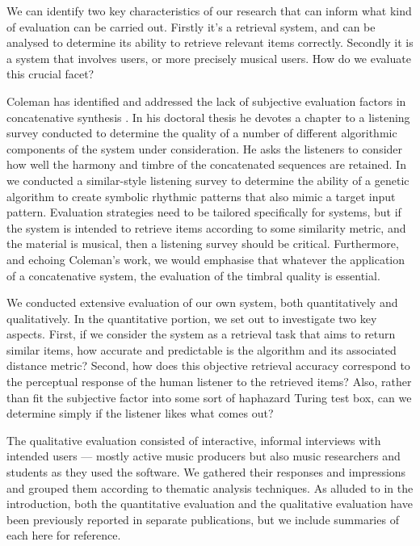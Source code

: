 We can identify two key characteristics of our research that can inform what kind of evaluation can be carried out. Firstly it’s a retrieval system, and can be analysed to determine its ability to retrieve relevant items correctly. Secondly it is a system that involves users, or more precisely musical users. How do we evaluate this crucial facet?

Coleman has identified and addressed the lack of subjective evaluation factors in concatenative synthesis \citep{Coleman2015}. In his doctoral thesis he devotes a chapter to a listening survey conducted to determine the quality of a number of different algorithmic components of the system under consideration. He asks the listeners to consider how well the harmony and timbre of the concatenated sequences are retained. In  we conducted a similar-style listening survey to determine the ability of a genetic algorithm to create symbolic rhythmic patterns that also mimic a target input pattern. Evaluation strategies need to be tailored specifically for systems, but if the system is intended to retrieve items according to some similarity metric, and the material is musical, then a listening survey should be critical. Furthermore, and echoing Coleman's work, we would emphasise that whatever the application of a concatenative system, the evaluation of the timbral quality is essential.

We conducted extensive evaluation of our own system, both quantitatively and qualitatively. In the quantitative portion, we set out to investigate two key aspects. First, if we consider the system as a retrieval task that aims to return similar items, how accurate and predictable is the algorithm and its associated distance metric? Second, how does this objective retrieval accuracy correspond to the perceptual response of the human listener to the retrieved items? Also, rather than fit the subjective factor into some sort of haphazard Turing test box, can we determine simply if the listener likes what comes out? 

The qualitative evaluation consisted of interactive, informal interviews with intended users — mostly active music producers but also music researchers and students as they used the software. We gathered their responses and impressions and grouped them according to thematic analysis techniques. As alluded to in the introduction, both the quantitative evaluation and the qualitative evaluation have been previously reported in separate publications, but we include summaries of each here for reference.

